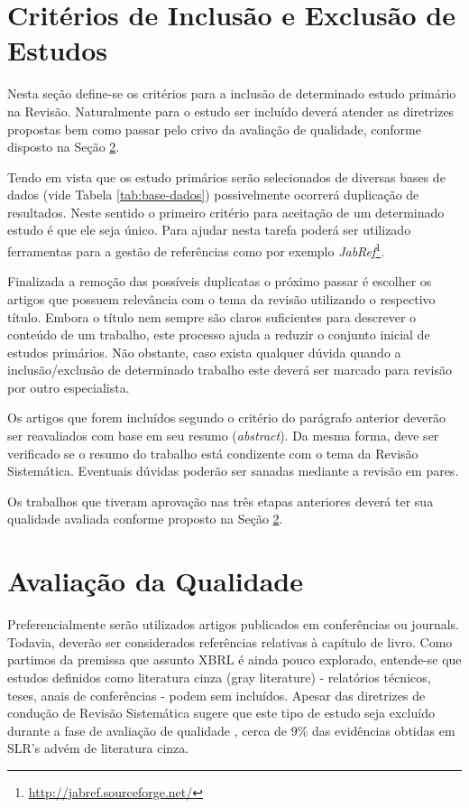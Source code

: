 \documentclass{article}
\begin{document}
\section{Critérios de Inclusão e Exclusão de Estudos}
\label{sec:criterios_in_out}

Nesta seção define-se os critérios para a inclusão de determinado estudo
primário na Revisão. Naturalmente para o estudo ser incluído deverá atender as diretrizes propostas bem
como passar pelo crivo da avaliação de qualidade, conforme disposto na Seção
\ref{sec:qualidade}.

Tendo em vista que os estudo primários serão selecionados de diversas bases de
dados (vide Tabela \ref{tab:base-dados}) possivelmente ocorrerá duplicação de
resultados. Neste sentido o primeiro critério para aceitação de um determinado
estudo é que ele seja único. Para ajudar nesta tarefa poderá ser utilizado
ferramentas para a gestão de referências como por exemplo
\textit{JabRef}\footnote{\url{http://jabref.sourceforge.net/}}.

Finalizada a remoção das possíveis duplicatas o próximo passar é escolher os
artigos que possuem relevância com o tema da revisão utilizando o respectivo
título. Embora o título nem sempre são claros suficientes para  descrever o conteúdo de um trabalho, este processo ajuda a reduzir o conjunto inicial de
estudos primários. Não obstante, caso exista qualquer dúvida quando a
inclusão/exclusão de determinado trabalho este deverá ser marcado para revisão
por outro especialista.

Os artigos que forem incluídos segundo o critério do parágrafo anterior deverão
ser reavaliados com base em seu resumo (\textit{abstract}). Da mesma forma,
deve ser verificado se o resumo do trabalho está condizente com o tema da
Revisão Sistemática. Eventuais dúvidas poderão ser sanadas mediante a revisão
em pares.

Os trabalhos que tiveram aprovação nas três etapas anteriores deverá ter sua
qualidade avaliada conforme proposto na Seção \ref{sec:qualidade}.

\section{Avaliação da Qualidade}
\label{sec:qualidade}

Preferencialmente serão utilizados artigos publicados em conferências ou
journals. Todavia, deverão ser considerados referências relativas à capítulo de
livro. Como partimos da premissa que assunto XBRL é ainda pouco explorado,
entende-se que estudos definidos como literatura cinza (gray literature) -
relatórios técnicos, teses, anais de conferências -  podem
sem incluídos. Apesar das diretrizes de condução de Revisão Sistemática sugere
que este tipo de estudo seja excluído durante a fase de avaliação de qualidade
\cite{keele2007guidelines}, cerca de $9\%$ das evidências obtidas em SLR's
advém de literatura cinza\cite{yasin2012quality}.
\end{document}
